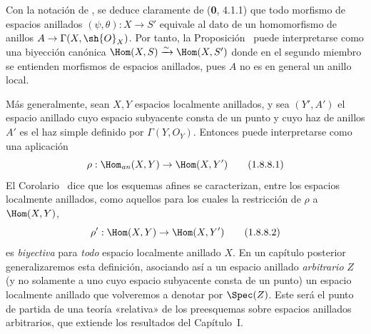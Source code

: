 \begin{env}[1.8.8]
\label{ega2:addendum:I.1.8.8-fr}
Con la notación de , se deduce claramente de
(\textbf 0, 4.1.1) que todo morfismo de espacios anillados
$(\psi,\theta):X\to S'$ equivale al dato de un homomorfismo de
anillos $A\to\Gamma(X,\sh{O}_X)$. Por tanto, la
Proposición~ puede interpretarse como una biyección
canónica
$\Hom(X,S)\xrightarrow{\sim}\Hom(X,S')$
donde en el segundo miembro se entienden morfismos de espacios
anillados, pues $A$ no es en general un anillo local.

Más generalmente, sean $X,Y$ espacios localmente anillados, y sea
$(Y',A')$ el espacio anillado cuyo espacio subyacente consta de un
punto y cuyo haz de anillos $A'$ es el haz simple definido por
$\Gamma(Y,O_Y)$. Entonces  puede interpretarse
como una aplicación
\begin{equation}
\label{ega2:addendum:I.1.8.8.1-fr}
  \rho:\Hom_{\mathit{an}}(X,Y)\to\Hom(X,Y')
\tag{1.8.8.1}
\end{equation}
El Corolario~ dice que los esquemas afines se
caracterizan, entre los espacios localmente anillados, como aquellos
para los cuales la restricción de $\rho$ a $\Hom(X,Y)$,
\begin{equation}
\label{ega2:addendum:I.1.8.8.2-fr}
  \rho':\Hom(X,Y)\to\Hom(X,Y')
\tag{1.8.8.2}
\end{equation}
es \emph{biyectiva} para \emph{todo} espacio localmente anillado $X$. En un capítulo
posterior generalizaremos esta definición, asociando así a un espacio
anillado \emph{arbitrario} $Z$ (y no solamente a uno cuyo espacio subyacente
consta de un punto) un espacio localmente anillado que volveremos a
denotar por $\Spec(Z)$. Este será el punto de partida de una teoría
«relativa» de los preesquemas sobre espacios anillados arbitrarios,
que extiende los resultados del Capítulo~I.
\end{env}

